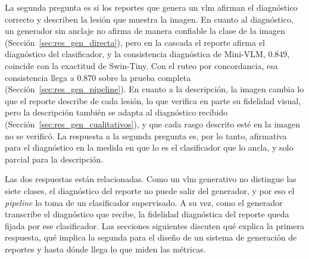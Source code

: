 La segunda pregunta es si los reportes que genera un \gls{vlm} afirman el diagnóstico correcto y describen la lesión
que muestra la imagen. En cuanto al diagnóstico, un generador sin anclaje no afirma de manera confiable la clase de la
imagen (Sección~\ref{sec:res_gen_directa}), pero en la cascada el reporte afirma el diagnóstico del clasificador, y la
consistencia diagnóstica de Mini-VLM, 0.849, coincide con la exactitud de Swin-Tiny. Con el ruteo por concordancia,
esa consistencia llega a 0.870 sobre la prueba completa (Sección~\ref{sec:res_gen_pipeline}). En cuanto a la
descripción, la imagen cambia lo que el reporte describe de cada lesión, lo que verifica en parte su fidelidad visual,
pero la descripción también se adapta al diagnóstico recibido (Sección~\ref{sec:res_gen_cualitativos}), y que cada
rasgo descrito esté en la imagen no se verificó. La respuesta a la segunda pregunta es, por lo tanto, afirmativa para
el diagnóstico en la medida en que lo es el clasificador que lo ancla, y solo parcial para la descripción.

Las dos respuestas están relacionadas. Como un \gls{vlm} generativo no distingue las siete clases, el diagnóstico del
reporte no puede salir del generador, y por eso el \emph{pipeline} lo toma de un clasificador supervisado. A su vez,
como el generador transcribe el diagnóstico que recibe, la fidelidad diagnóstica del reporte queda fijada por ese
clasificador. Las secciones siguientes discuten qué explica la primera respuesta, qué implica la segunda para el
diseño de un sistema de generación de reportes y hasta dónde llega lo que miden las métricas.
